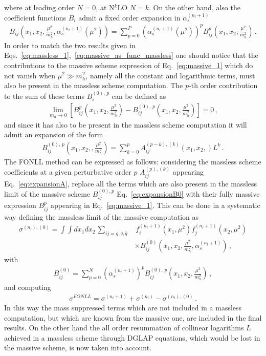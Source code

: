 where at leading order $N=0$, at N$^k$LO $N=k$.
On the other hand, also the coefficient functions $B_i$ admit a fixed order expansion in $\alpha_s^{(n_l+1)}$
\begin{align}
    \label{eq:massive_1}
    B_{ij}\left(x_1,x_2,\frac{\mu^2}{m_h^2},\alpha_s^{(n_l+1)}\left(\mu^2\right)\right)
    = \sum_{p=0}^P \left(\alpha_s^{(n_l+1)}\left(\mu^2\right)\right)^p B_{ij}^p\left(x_1,x_2,\frac{\mu^2}{m_h^2}\right)\,.
\end{align}
In order to match the two results given in Eqs.~\ref{eq:massless_1},~\ref{eq:massive_as_func_massless} 
one should notice that the contributions to the massive scheme expression of Eq.~\ref{eq:massive_1}
which do not vanish when $\mu^2 \gg m_h^2$, namely all the constant and logarithmic terms, 
must also be present in the massless scheme computation.
The $p$-th order contribution to the sum of these terms $B_i^{(0),\,p}$ can be defined as
\begin{align}
    \lim_{m_h\rightarrow 0}\left[B_{ij}^p\left(x_1,x_2,\frac{\mu^2}{m_h^2}\right)- 
    B_{ij}^{(0),\,p}\left(x_1,x_2,\frac{\mu^2}{m_h^2}\right)\right] = 0\,,
\end{align}
and since it has also to be present in the massless scheme computation it will admit an expansion of the form
\begin{align}
    \label{eq:expansionB0}
    B_{ij}^{(0),\,p}\left(x_1,x_2,,\frac{\mu^2}{m_h^2}\right) = \sum_{k=0}^p  A_{ij}^{(p-k),(k)}\left(x_1,x_2,\right)L^k\,.
\end{align}
The FONLL method can be expressed as follows: considering the massless scheme coefficients
at a given perturbative order $p$ $A^{(p),(k)}_{ij}$ 
appearing Eq.~\ref{eq:expansionA}, replace all the terms which are also present in the massless limit of the massive scheme
$B^{(0),p}_{ij}$ Eq.~\ref{eq:expansionB0} with their fully massive expression $B^{p}_{ij}$ appearing in Eq.~\ref{eq:massive_1}.
This can be done in a systematic way defining the massless limit of the massive computation as
\begin{align}
    \label{eq:massive_massless_limit}
    \sigma^{(n_l),(0)} = \int \int dx_1 dx_2\, \sum_{ij = g,q,\bar{q} }&\, 
    f_i^{(n_l+1)}\left(x_1,\mu^2\right)f_j^{(n_l+1)}\left(x_2,\mu^2\right) \nonumber \\
    &\times B^{(0)}_{ij}\left(x_1,x_2,\frac{\mu^2}{m_h^2},\alpha_s^{(n_l+1)}\right)\,,
\end{align}
with
\begin{align}
    B^{(0)}_{ij} = \sum_{p=0}^N \left(\alpha_s^{(n_l+1)}\right)^p  B_{ij}^{(0),\,p}\left(x_1,x_2,\frac{\mu^2}{m_h^2}\right)\,,
\end{align}
and computing 
\begin{align}
    \sigma^{FONLL} = \sigma^{(n_l+1)} + \sigma^{(n_l)} - \sigma^{(n_l),(0)}\,.
\end{align}
In this way the mass suppressed terms which are not included in a massless computation, but which
are known from the massive one, are included in the final results.
On the other hand the all order resummation of collinear logarithms $L$ achieved 
in a massless scheme through DGLAP equations, which would be lost in the massive scheme, is now taken into account.